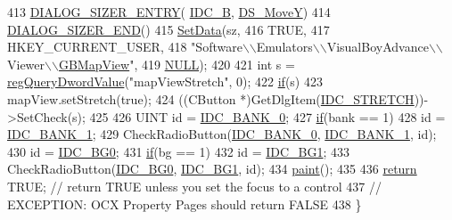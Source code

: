 \begin{DoxyCode}
413     \mbox{\hyperlink{_resize_dlg_8h_a0e9ee7a18c54003893895a009f5d79c8}{DIALOG\_SIZER\_ENTRY}}( \mbox{\hyperlink{resource_8h_a96306052e53348b1e760b8dcabf2b0c7}{IDC\_B}}, \mbox{\hyperlink{_resize_dlg_8h_ae5309071be822a4dae5cb33a131f6180}{DS\_MoveY}})    
414     \mbox{\hyperlink{_resize_dlg_8h_aeac0c1e32f30e0763df5736e4b3ea50a}{DIALOG\_SIZER\_END}}()
415     \mbox{\hyperlink{class_resize_dlg_a6a3965f44a0c2f5ba9aaa798a9a81df5}{SetData}}(sz,
416             TRUE,
417             HKEY\_CURRENT\_USER,
418             "Software\(\backslash\)\(\backslash\)Emulators\(\backslash\)\(\backslash\)VisualBoyAdvance\(\backslash\)\(\backslash\)Viewer\(\backslash\)\(\backslash\)\mbox{\hyperlink{class_g_b_map_view}{GBMapView}}",
419             \mbox{\hyperlink{getopt1_8c_a070d2ce7b6bb7e5c05602aa8c308d0c4}{NULL}});
420 
421   \textcolor{keywordtype}{int} s = \mbox{\hyperlink{_reg_8cpp_a150640889ffff4851ee26d7b999ec7c3}{regQueryDwordValue}}("mapViewStretch", 0);
422   \mbox{\hyperlink{arm-new_8h_a93120066fd6daa54150af823953378d1}{if}}(s)
423     mapView.setStretch(true);
424   ((CButton *)GetDlgItem(\mbox{\hyperlink{resource_8h_a639d2318d8892c6f42b323500aae50f0}{IDC\_STRETCH}}))->SetCheck(s);
425 
426   UINT \textcolor{keywordtype}{id} = \mbox{\hyperlink{resource_8h_a190a3b55c16d4bfa4df4bc4334a82568}{IDC\_BANK\_0}};
427   \mbox{\hyperlink{arm-new_8h_a93120066fd6daa54150af823953378d1}{if}}(bank == 1)
428     \textcolor{keywordtype}{id} = \mbox{\hyperlink{resource_8h_ae657eb8f2ec86b79fb9962dda16c1130}{IDC\_BANK\_1}};
429   CheckRadioButton(\mbox{\hyperlink{resource_8h_a190a3b55c16d4bfa4df4bc4334a82568}{IDC\_BANK\_0}}, \mbox{\hyperlink{resource_8h_ae657eb8f2ec86b79fb9962dda16c1130}{IDC\_BANK\_1}}, \textcolor{keywordtype}{id});
430   \textcolor{keywordtype}{id} = \mbox{\hyperlink{resource_8h_ac10192f91d4434cb8a1a3c00c0e143e3}{IDC\_BG0}};
431   \mbox{\hyperlink{arm-new_8h_a93120066fd6daa54150af823953378d1}{if}}(bg == 1)
432     \textcolor{keywordtype}{id} = \mbox{\hyperlink{resource_8h_a238da5af2b82de3c8d0563394f97f6b2}{IDC\_BG1}};
433   CheckRadioButton(\mbox{\hyperlink{resource_8h_ac10192f91d4434cb8a1a3c00c0e143e3}{IDC\_BG0}}, \mbox{\hyperlink{resource_8h_a238da5af2b82de3c8d0563394f97f6b2}{IDC\_BG1}}, \textcolor{keywordtype}{id});
434   \mbox{\hyperlink{class_g_b_map_view_a42de669273417186b01ca6f8d06eb347}{paint}}();
435 
436   \mbox{\hyperlink{gb_codes_8h_a9717e7bbecb906637e86cef6da3d83c2}{return}} TRUE;  \textcolor{comment}{// return TRUE unless you set the focus to a control}
437                 \textcolor{comment}{// EXCEPTION: OCX Property Pages should return FALSE}
438 \}
\end{DoxyCode}

